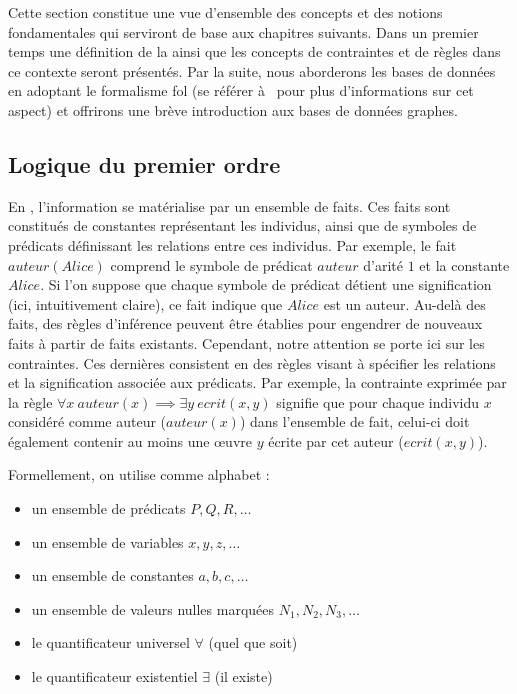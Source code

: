 Cette section constitue une vue d'ensemble des concepts et des notions fondamentales qui serviront de base aux chapitres suivants.
Dans un premier temps une définition de la  ainsi que les concepts de contraintes et de règles dans ce contexte seront présentés.
Par la suite, nous aborderons les bases de données en adoptant le formalisme \gls{fol} (se référer à~\cite{abiteboulFoundationsDatabases1995} pour plus d'informations sur cet aspect) et offrirons une brève introduction aux bases de données graphes.

\subsection{Logique du premier ordre}
\label{sec:update:pre:logic}

En , l'information se matérialise par un ensemble de faits.
Ces faits sont constitués de constantes représentant les individus, ainsi que de symboles de prédicats définissant les relations entre ces individus.
Par exemple, le fait $auteur(Alice)$ comprend le symbole de prédicat $auteur$ d'arité $1$ et la constante $Alice$.
Si l'on suppose que chaque symbole de prédicat détient une signification (ici, intuitivement claire), ce fait indique que $Alice$ est un auteur.
Au-delà des faits, des règles d'inférence peuvent être établies pour engendrer de nouveaux faits à partir de faits existants.
Cependant, notre attention se porte ici sur les contraintes.
Ces dernières consistent en des règles visant à spécifier les relations et la signification associée aux prédicats.
Par exemple, la contrainte exprimée par la règle $\forall x~auteur(x) \implies \exists y~ecrit(x,y)$ signifie que pour chaque individu $x$ considéré comme auteur ($auteur(x)$) dans l'ensemble de fait, celui-ci doit également contenir au moins une œuvre $y$ écrite par cet auteur ($ecrit(x,y)$).

Formellement, on utilise comme alphabet :
\begin{itemize}
    \item un ensemble de prédicats $P, Q, R, \dots$
    \item un ensemble de variables $x, y, z, \dots$
    \item un ensemble de constantes $a, b, c, \dots$
    \item un ensemble de valeurs nulles marquées $N_1, N_2, N_3, \dots$
    \item le quantificateur universel $\forall$ (quel que soit)
    \item le quantificateur existentiel $\exists$ (il existe)
\end{itemize}


